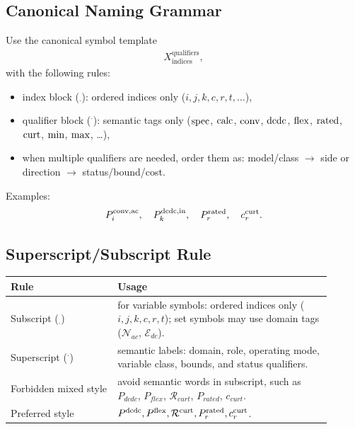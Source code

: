 \subsection{Canonical Naming Grammar}

Use the canonical symbol template
\begin{align}
X_{\text{indices}}^{\text{qualifiers}},
\end{align}
with the following rules:
\begin{itemize}
  \item index block (\(_{\cdot}\)): ordered indices only (\(i,j,k,c,r,t,\dots\)),
  \item qualifier block (\(^{\cdot}\)): semantic tags only (\(\mathrm{spec}\), \(\mathrm{calc}\), \(\mathrm{conv}\), \(\mathrm{dcdc}\), \(\mathrm{flex}\), \(\mathrm{rated}\), \(\mathrm{curt}\), \(\mathrm{min}\), \(\mathrm{max}\), \dots),
  \item when multiple qualifiers are needed, order them as: model/class \(\rightarrow\) side or direction \(\rightarrow\) status/bound/cost.
\end{itemize}

Examples:
\begin{align}
P_i^{\mathrm{conv,ac}},\quad
P_k^{\mathrm{dcdc,in}},\quad
P_r^{\mathrm{rated}},\quad
c_r^{\mathrm{curt}}.
\end{align}

\subsection{Superscript/Subscript Rule}

\begin{longtable}{L{0.30\linewidth}L{0.60\linewidth}}
\toprule
Rule & Usage \\
\midrule
\endhead
Subscript (\(_{\cdot}\)) & for variable symbols: ordered indices only (\(i,j,k,c,r,t\)); set symbols may use domain tags (\(\mathcal{N}_{ac}\), \(\mathcal{E}_{dc}\)). \\
Superscript (\(^{\cdot}\)) & semantic labels: domain, role, operating mode, variable class, bounds, and status qualifiers. \\
Forbidden mixed style & avoid semantic words in subscript, such as \(P_{dcdc}\), \(P_{flex}\), \(\mathcal{R}_{curt}\), \(P_{rated}\), \(c_{curt}\). \\
Preferred style & \(P^{\mathrm{dcdc}}, P^{\mathrm{flex}}, \mathcal{R}^{\mathrm{curt}}, P_r^{\mathrm{rated}}, c_r^{\mathrm{curt}}\). \\
\bottomrule
\end{longtable}

